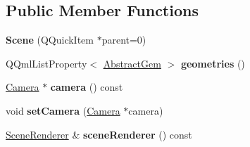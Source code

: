 \subsection*{Public Member Functions}
\begin{DoxyCompactItemize}
\item 
\hypertarget{class_scene_a93f88c89ce94ad70a668225522818b1e}{}{\bfseries Scene} (Q\+Quick\+Item $\ast$parent=0)\label{class_scene_a93f88c89ce94ad70a668225522818b1e}

\item 
\hypertarget{class_scene_a34966e5d9859ef84b3867b29f26c4dc6}{}Q\+Qml\+List\+Property$<$ \hyperlink{class_abstract_gem}{Abstract\+Gem} $>$ {\bfseries geometries} ()\label{class_scene_a34966e5d9859ef84b3867b29f26c4dc6}

\item 
\hypertarget{class_scene_a81b014ae882dfaec147d917b1ea99d68}{}\hyperlink{class_camera}{Camera} $\ast$ {\bfseries camera} () const \label{class_scene_a81b014ae882dfaec147d917b1ea99d68}

\item 
\hypertarget{class_scene_a4c722c43b266a642a4a06d0d818b14d1}{}void {\bfseries set\+Camera} (\hyperlink{class_camera}{Camera} $\ast$camera)\label{class_scene_a4c722c43b266a642a4a06d0d818b14d1}

\item 
\hypertarget{class_scene_ac8f232cf7cae52e2a235f63589fe85b5}{}\hyperlink{class_scene_renderer}{Scene\+Renderer} \& {\bfseries scene\+Renderer} () const \label{class_scene_ac8f232cf7cae52e2a235f63589fe85b5}


\end{DoxyCompactItemize}
